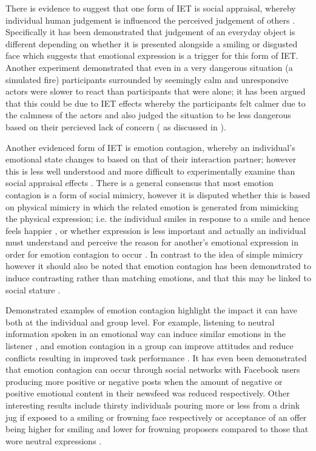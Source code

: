 \documentclass[11pt]{article}
\begin{document}
There is evidence to suggest that one form of IET is social appraisal, whereby individual human judgement is influenced the perceived judgement of others \cite{parkinson2011interpersonal}. Specifically it has been demonstrated that judgement of an everyday object is different depending on whether it is presented alongside a smiling or disgusted face \cite{bayliss2007affective} which suggests that emotional expression is a trigger for this form of IET. Another experiment demonstrated that even in a very dangerous situation (a simulated fire) participants surrounded by seemingly calm and unresponsive actors were slower to react than participants that were alone; it has been argued that this could be due to IET effects whereby the participants felt calmer due to the calmness of the actors and also judged the situation to be less dangerous based on their percieved lack of concern (\cite{latane1968group} as discussed in \cite{parkinson2011interpersonal}).

Another evidenced form of IET is emotion contagion, whereby an individual's emotional state changes to based on that of their interaction partner; however this is less well understood and more difficult to experimentally examine than social appraisal effects \cite{parkinson2011interpersonal}. There is a general consensus that most emotion contagion is a form of social mimicry, however it is disputed whether this is based on physical mimicry in which the related emotion is generated from mimicking the physical expression; i.e. the individual smiles in response to a smile and hence feels happier \cite{strack1988inhibiting}, or whether expression is less important and actually an individual must understand and perceive the reason for another's emotional expression in order for emotion contagion to occur \cite{tamietto2009unseen}. In contrast to the idea of simple mimicry however it should also be noted that emotion contagion has been demonstrated to induce contrasting rather than matching emotions, and that this may be linked to social stature \cite{tiedens2003power}.

Demonstrated examples of emotion contagion highlight the impact it can have both at the individual and group level. For example, listening to neutral information spoken in an emotional way can induce similar emotions in the listener \cite{neumann2000mood}, and emotion contagion in a group can improve attitudes and reduce conflicts resulting in improved task performance \cite{barsade2002ripple}. It has even been demonstrated that emotion contagion can occur through social networks with Facebook users producing more positive or negative posts when the amount of negative or positive emotional content in their newsfeed was reduced \cite{kramer2014experimental} respectively. Other interesting results include thirsty individuals pouring more or less from a drink jug if exposed to a smiling or frowning face respectively \cite{winkielman2005unconscious} or acceptance of an offer being higher for smiling and lower for frowning proposers compared to those that wore neutral expressions \cite{mussel2013value}. 
\end{document}
